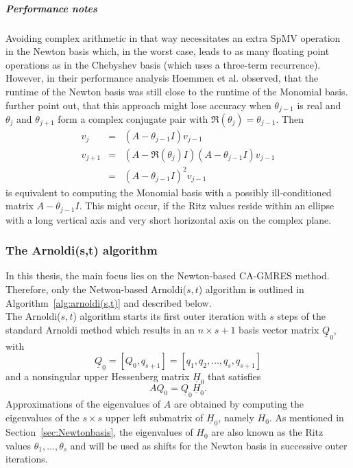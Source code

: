 \documentclass{scrartcl}
\numberwithin{equation}{section}
\begin{document}
\subparagraph{Performance notes}
Avoiding complex arithmetic in that way necessitates an extra SpMV operation in the Newton basis which, in the worst case, leads to as many floating point operations as in the Chebyshev basis (which uses a three-term recurrence). However, in their performance analysis Hoemmen et al. \cite{Hoemmen:2010:CKS:1970638} observed, that the runtime of the Newton basis was still close to the runtime of the Monomial basis. \\
\cite{Hoemmen:2010:CKS:1970638} further point out, that this approach might lose accuracy when $\theta_{j - 1}$ is real and $\theta_j$ and $\theta_{j + 1}$ form a complex conjugate pair with $\Re(\theta_j) = \theta_{j - 1} $. Then
\begin{eqnarray*}
v_j &=& (A - \theta_{j - 1} I )v_{j - 1} \\
v_{j + 1} &=& (A - \Re(\theta_j) I )(A - \theta_{j - 1} I )v_{j - 1} \\
		  &=& (A - \theta_{j - 1} I )^2v_{j - 1}
\end{eqnarray*}
is equivalent to computing the Monomial basis with a possibly ill-conditioned  matrix $A - \theta_{j - 1} I$. This might occur, if the Ritz values reside within an ellipse with a long vertical axis and very short horizontal axis on the complex plane.

\subsubsection{The Arnoldi(s,t) algorithm}

In this thesis, the main focus lies on the Newton-based CA-GMRES method. Therefore, only the Netwon-based Arnoldi($s,t$) algorithm is outlined in Algorithm~\ref{alg:arnoldi(s,t)} and described below.\\

The Arnoldi($s,t$) algorithm starts its first outer iteration with $s$ steps of the standard Arnoldi method which results in an $n \times s + 1$ basis vector matrix $\underline{Q}_0$, with
\begin{equation}
\underline{Q}_0 = [Q_0, q_{s + 1}] = [q_1, q_2, \ldots, q_s, q_{s + 1}]
\end{equation}
and a nonsingular upper Hessenberg matrix $\underline{H}_0$ that satisfies
\begin{equation}
AQ_0 = \underline{Q}_0 \underline{H}_0.
\end{equation}
Approximations of the eigenvalues of $A$ are obtained by computing the eigenvalues of the $s \times s$ upper left submatrix of $\underline{H}_0$, namely $H_0$. As mentioned in Section~\ref{sec:Newtonbasis}, the eigenvalues of $H_0$ are also known as the Ritz values $\theta_1, \ldots, \theta_s$ and will be used as shifts for the Newton basis in successive outer iterations.\\
\end{document}
